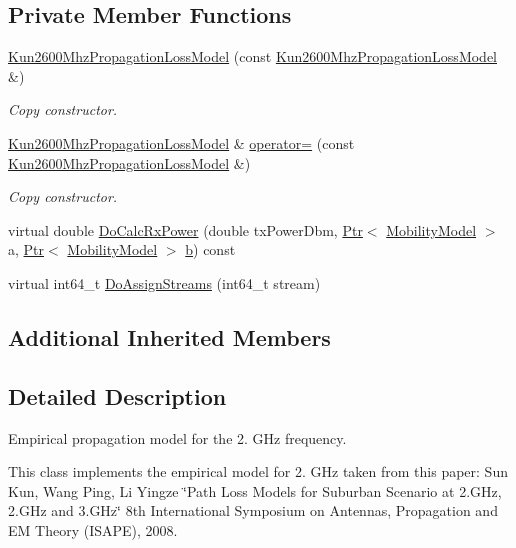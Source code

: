 \subsection*{Private Member Functions}
\begin{DoxyCompactItemize}
\item 
\hyperlink{classns3_1_1Kun2600MhzPropagationLossModel_a6cf7d527a789585d3ef90a3cf61b80ac}{Kun2600\+Mhz\+Propagation\+Loss\+Model} (const \hyperlink{classns3_1_1Kun2600MhzPropagationLossModel}{Kun2600\+Mhz\+Propagation\+Loss\+Model} \&)
\begin{DoxyCompactList}\small\item\em Copy constructor. \end{DoxyCompactList}\item 
\hyperlink{classns3_1_1Kun2600MhzPropagationLossModel}{Kun2600\+Mhz\+Propagation\+Loss\+Model} \& \hyperlink{classns3_1_1Kun2600MhzPropagationLossModel_a2b7cfbf3ae5bccff77a5370ac7ebc3ed}{operator=} (const \hyperlink{classns3_1_1Kun2600MhzPropagationLossModel}{Kun2600\+Mhz\+Propagation\+Loss\+Model} \&)
\begin{DoxyCompactList}\small\item\em Copy constructor. \end{DoxyCompactList}\item 
virtual double \hyperlink{classns3_1_1Kun2600MhzPropagationLossModel_a705cd3abfe2e8d5841cfb629e210d8c2}{Do\+Calc\+Rx\+Power} (double tx\+Power\+Dbm, \hyperlink{classns3_1_1Ptr}{Ptr}$<$ \hyperlink{classns3_1_1MobilityModel}{Mobility\+Model} $>$ a, \hyperlink{classns3_1_1Ptr}{Ptr}$<$ \hyperlink{classns3_1_1MobilityModel}{Mobility\+Model} $>$ \hyperlink{lte__pathloss_8m_a21ad0bd836b90d08f4cf640b4c298e7c}{b}) const 
\item 
virtual int64\+\_\+t \hyperlink{classns3_1_1Kun2600MhzPropagationLossModel_a482e207a7dd8dfc874237bd1c8b43e07}{Do\+Assign\+Streams} (int64\+\_\+t stream)
\end{DoxyCompactItemize}
\subsection*{Additional Inherited Members}


\subsection{Detailed Description}
Empirical propagation model for the 2. G\+Hz frequency. 

This class implements the empirical model for 2. G\+Hz taken from this paper\+: Sun Kun, Wang Ping, Li Yingze \char`\"{}\+Path Loss Models for Suburban Scenario at 2.\+G\+Hz, 2.\+G\+Hz and 3.\+G\+Hz\char`\"{} 8th International Symposium on Antennas, Propagation and EM Theory (I\+S\+A\+PE), 2008. 

